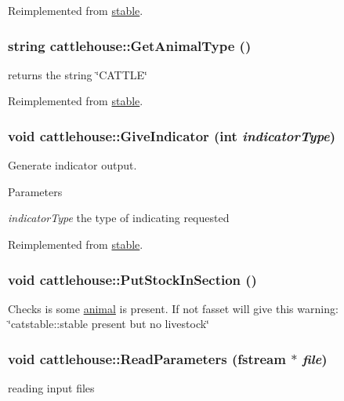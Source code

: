 Reimplemented from \hyperlink{classstable_a8bdbc59976ddb6c324e7b629794ff388}{stable}.\hypertarget{classcattlehouse_ab4c837c538894c34c19d7a1cf23ce09f}{
\subsubsection[{GetAnimalType}]{\setlength{\rightskip}{0pt plus 5cm}string cattlehouse::GetAnimalType ()}}
\label{classcattlehouse_ab4c837c538894c34c19d7a1cf23ce09f}
returns the string \char`\"{}CATTLE\char`\"{} 

Reimplemented from \hyperlink{classstable_af11653ccffcdc3bfb928d47485fc39b4}{stable}.\hypertarget{classcattlehouse_ab71be5e3ab86351671ae24119ec62bd4}{
\subsubsection[{GiveIndicator}]{\setlength{\rightskip}{0pt plus 5cm}void cattlehouse::GiveIndicator (int {\em indicatorType})}}
\label{classcattlehouse_ab71be5e3ab86351671ae24119ec62bd4}


Generate indicator output. 
\begin{DoxyParams}{Parameters}
\item[{\em indicatorType}]the type of indicating requested \end{DoxyParams}


Reimplemented from \hyperlink{classstable_a2911ffc8041366d46674bf48a6b4d6c5}{stable}.\hypertarget{classcattlehouse_ad36720d676b62f2e8705994e70e0daf3}{
\subsubsection[{PutStockInSection}]{\setlength{\rightskip}{0pt plus 5cm}void cattlehouse::PutStockInSection ()}}
\label{classcattlehouse_ad36720d676b62f2e8705994e70e0daf3}
Checks is some \hyperlink{classanimal}{animal} is present. If not fasset will give this warning: \char`\"{}catstable::stable present but no livestock\char`\"{} \hypertarget{classcattlehouse_a113f5bf0d97865c9872c0c4efd073861}{
\subsubsection[{ReadParameters}]{\setlength{\rightskip}{0pt plus 5cm}void cattlehouse::ReadParameters (fstream $\ast$ {\em file})}}
\label{classcattlehouse_a113f5bf0d97865c9872c0c4efd073861}
reading input files 

